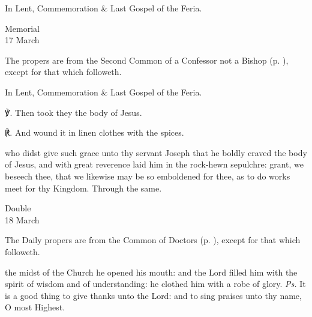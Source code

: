 \begin{rubric}
	In Lent, Commemoration \& Last Gospel of the Feria.
\end{rubric}


\begin{inhead}
    {Memorial\\
17 March}
\end{inhead}

\begin{rubric}
	The propers are from the Second Common of a Confessor not a Bishop (p. \pageref{CommonConfessorNotBishopII}), except for that which followeth.
\end{rubric}
\begin{rubric}
	In Lent, Commemoration \& Last Gospel of the Feria.
\end{rubric}

    ℣. Then took they the body of Jesus.

	℟. And wound it in linen clothes with the spices.

 
\collect\label{ArimatheanCollect}
 who didst give such grace unto thy servant Joseph that he boldly craved the body of Jesus, and with great reverence laid him in the rock-hewn sepulchre: grant, we beseech thee, that we likewise may be so emboldened for thee, as to do works meet for thy Kingdom. Through the same.


\begin{inhead}
    {Double\\
18 March}
\end{inhead}

\begin{rubric}
	The Daily propers are from the Common of Doctors (p. \pageref{CommonDoctors}), except for that which followeth.
\end{rubric}

\introit
{} the midst of the Church he opened his mouth: and the Lord filled him with the spirit of wisdom and of understanding: he clothed him with a robe of glory. \textit{Ps.} It is a good thing to give thanks unto the Lord: and to sing praises unto thy name, O most Highest.

